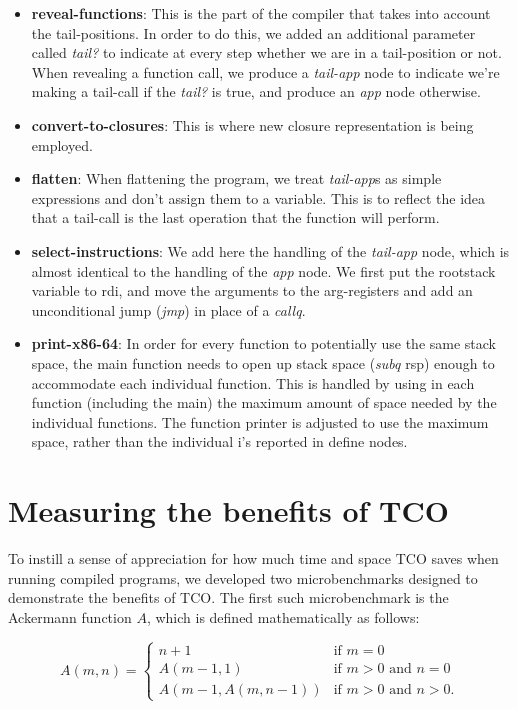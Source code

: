 \documentclass[12pt]{article}
\begin{document}
\begin{itemize}
\item \textbf{reveal-functions}: This is the part of the compiler that
  takes into account the tail-positions. In order to do this, we added
  an additional parameter called \emph{tail?} to indicate at every
  step whether we are in a tail-position or not. When revealing a
  function call, we produce a \emph{tail-app} node to indicate we're
  making a tail-call if the \emph{tail?} is true, and produce an
  \emph{app} node otherwise.
\item \textbf{convert-to-closures}: This is where new closure
  representation is being employed.
\item \textbf{flatten}: When flattening the program, we treat
  \emph{tail-app}s as simple expressions and don't assign them to a
  variable. This is to reflect the idea that a tail-call is the last
  operation that the function will perform.
\item \textbf{select-instructions}: We add here the handling of the
  \emph{tail-app} node, which is almost identical to the handling of
  the \emph{app} node. We first put the rootstack variable to rdi, and
  move the arguments to the arg-registers and add an unconditional
  jump (\emph{jmp}) in place of a \emph{callq}.
\item \textbf{print-x86-64}: In order for every function to
  potentially use the same stack space, the main function needs to
  open up stack space (\emph{subq} rsp) enough to accommodate each
  individual function. This is handled by using in each function
  (including the main) the maximum amount of space needed by the
  individual functions. The function printer is adjusted to use the
  maximum space, rather than the individual i's reported in define
  nodes.
\end{itemize}

\section{Measuring the benefits of TCO}

To instill a sense of appreciation for how much time and space TCO saves when running
compiled programs, we developed two microbenchmarks designed to demonstrate the benefits
of TCO. The first such microbenchmark is the Ackermann function $A$, which is defined
mathematically as follows:

$$
A(m, n) = \begin{cases}
  n+1               & \mbox{if } m = 0 \\
  A(m-1, 1)         & \mbox{if } m > 0 \mbox{ and } n = 0 \\
  A(m-1, A(m, n-1)) & \mbox{if } m > 0 \mbox{ and } n > 0.
\end{cases}
$$
\end{document}
